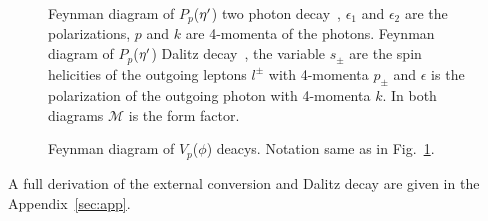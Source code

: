  \begin{figure}[h!]\begin{center}
 		\quad
 		\caption[Feynman diagram of $P_p$($\etaP$) two photon decay and Dalitz decay]{\label{fig:piz.alldecay}Feynman diagram of $P_p$($\etaP$) two photon decay~, $\epsilon_1$ and $\epsilon_2$ are the polarizations, $p$ and $k$ are 4-momenta of the photons.  Feynman diagram of $P_p$($\etaP$) Dalitz decay~, the variable $s_\pm$ are the spin helicities of the outgoing leptons $l^\pm$ with 4-momenta $p_{\pm}$ and $\epsilon$ is the polarization of the outgoing photon with 4-momenta $k$. In both diagrams $\mathcal{M}$ is the form factor.}
\end{center}\end{figure}
\begin{figure}[h!]\begin{center}
 	 		\quad
 	 		\caption[Feynman diagram of $V_p$($\phi$) decays]{\label{fig:phi.alldecay}Feynman diagram of $V_p$($\phi$) deacys. Notation same as in Fig.~\ref{fig:piz.alldecay}.}
\end{center}\end{figure}
 A full derivation of the external conversion and Dalitz decay are given in the Appendix~\ref{sec:app}.
